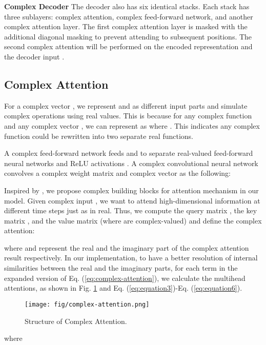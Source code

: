 \documentclass{article}
\begin{document}
\textbf{Complex Decoder} The decoder also has six identical stacks. Each stack has three sublayers: complex attention, complex feed-forward network, and another complex attention layer. The first complex attention layer is masked with the additional diagonal masking to prevent attending to subsequent positions. The second complex attention will be performed on the encoded representation  and the decoder input . 

\subsection{Complex Attention}

For a complex vector , we represent  and  as different input parts and simulate complex operations using real values. This is because for any complex function  and any complex vector , we can represent  as  where   \cite{arjovsky2016unitary}. This indicates any complex function could be rewritten into two separate real functions.

A complex feed-forward network feeds  and  to separate real-valued feed-forward neural networks and ReLU activations \cite{trabelsi2017deep}. A complex convolutional neural network \cite{trabelsi2017deep} convolves a complex weight matrix  and complex vector  as the following:


Inspired by \cite{vaswani2017attention}, we propose complex building blocks for attention mechanism in our model. Given complex input , we want to attend high-dimensional information at different time steps just as in real. Thus, we compute the query matrix , the key matrix , and the value matrix  (where  are complex-valued) and define the complex attention: 


where  and  represent the real and the imaginary part of the complex attention result respectively. In our implementation, to have a better resolution of internal similarities between the real and the imaginary parts, for each term in the expanded version of Eq. (\ref{eq:complex-attention}), we calculate the multihead attentions, as shown in Fig. \ref{fig:spec} and Eq. (\ref{eq:equation3})-Eq. (\ref{eq:equation6}).

\begin{figure}[H]
\texttt{[image: fig/complex-attention.png]}
\caption{Structure of Complex Attention.}
\label{fig:spec}
\end{figure}


where
\end{document}
